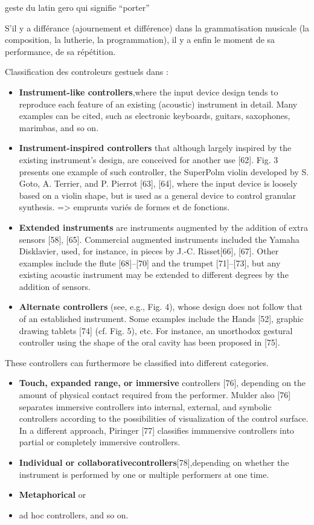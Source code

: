 geste du latin gero qui signifie ``porter''

S'il y a différance (ajournement et différence) dans la grammatisation musicale (la composition, la lutherie, la programmation), il y a enfin le moment de sa performance, de sa répétition.

Classification des controleurs gestuels dans \cite{wanderley_controgestuel_1999}:
\vspace{-1em}
\begin{itemize}[noitemsep]
\item \textbf{Instrument-like controllers},where the input device design tends to reproduce each feature of an existing (acoustic) instrument in detail. Many examples can be cited, such as electronic keyboards, guitars, saxophones, marimbas, and so on.
\item \textbf{Instrument-inspired controllers} that although largely inspired by the existing instrument’s design, are conceived for another use [62]. Fig. 3 presents one example of such controller, the SuperPolm violin developed by S. Goto, A. Terrier, and P. Pierrot [63], [64], where the input device is loosely based on a violin shape, but is used as a general device to control granular synthesis. => emprunts variés de formes et de fonctions.
\item \textbf{Extended instruments} are instruments augmented by the addition of extra sensors [58], [65]. Commercial augmented instruments included the Yamaha Disklavier, used, for instance, in pieces by J.-C. Risset[66], [67]. Other examples include the flute [68]–[70] and the trumpet [71]–[73], but any existing acoustic instrument may be extended to different degrees by the addition of sensors.
\item \textbf{Alternate controllers} (see, e.g., Fig. 4), whose design does not follow that of an established instrument. Some examples include the Hands [52], graphic drawing tablets [74] (cf. Fig. 5), etc. For instance, an unorthodox gestural controller using the shape of the oral cavity has been proposed in [75].
\end{itemize}

These controllers can furthermore be classified into different categories.
\begin{itemize}[noitemsep]
\item \textbf{Touch, expanded range, or immersive} controllers [76], depending on the amount of physical contact required from the performer. Mulder also [76] separates immersive controllers into internal, external, and symbolic controllers according to the possibilities of visualization of the control surface. In a different approach, Piringer [77] classifies immmersive controllers into partial or completely immersive controllers.
\item \textbf{Individual or collaborativecontrollers}[78],depending on whether the instrument is performed by one or multiple performers at one time.
\item \textbf{Metaphorical} or \item{ad hoc} controllers, and so on.
\end{itemize}


